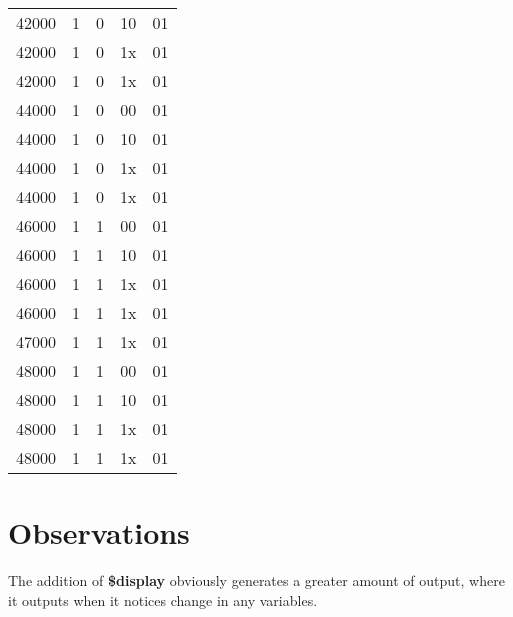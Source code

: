 \documentclass[paper=usletter, fontsize=12pt]{article}
\begin{document}
\begin{longtable*}{@{\extracolsep{\fill}} ccccc}
        42000 & 1 & 0 & 10 & 01 \\
        42000 & 1 & 0 & 1x & 01 \\
        42000 & 1 & 0 & 1x & 01 \\
        44000 & 1 & 0 & 00 & 01 \\
        44000 & 1 & 0 & 10 & 01 \\
        44000 & 1 & 0 & 1x & 01 \\
        44000 & 1 & 0 & 1x & 01 \\
        46000 & 1 & 1 & 00 & 01 \\
        46000 & 1 & 1 & 10 & 01 \\
        46000 & 1 & 1 & 1x & 01 \\
        46000 & 1 & 1 & 1x & 01 \\
        47000 & 1 & 1 & 1x & 01 \\
        48000 & 1 & 1 & 00 & 01 \\
        48000 & 1 & 1 & 10 & 01 \\
        48000 & 1 & 1 & 1x & 01 \\
        48000 & 1 & 1 & 1x & 01 \\
    \end{longtable*}

    \section{Observations}
    The addition of \textbf{\$display} obviously generates a greater amount of output, where it outputs when it notices change in any variables.
\end{document}
